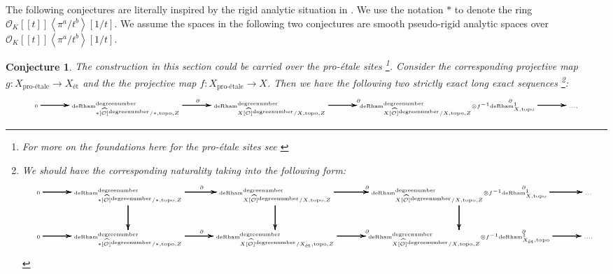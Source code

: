 \documentclass[11pt]{book}
\newtheorem{conjecture}[theorem]{Conjecture}
\theoremstyle{definition}
\numberwithin{equation}{section}
\begin{document}
\indent The following conjectures are literally inspired by the rigid analytic situation in \cite[Theorem 1.2]{12GL}. We use the notation $*$ to denote the ring $\mathcal{O}_K[[t]]\left<\pi^a/t^b\right>[1/t]$. We assume the spaces in the following two conjectures are smooth pseudo-rigid analytic spaces over $\mathcal{O}_K[[t]]\left<\pi^a/t^b\right>[1/t]$.


\newpage

\begin{landscape}
\begin{conjecture}
The construction in this section could be carried over the pro-\'etale sites \footnote{For more on the foundations here for the pro-\'etale sites see \cite[Theorem 2.9.9, Remark 2.9.10]{12Ked1}}. Consider the corresponding projective map $g:X_{\text{pro-\'etale}}\rightarrow X_{\text{\'et}}$ and the the projective map $f:X_{\text{pro-\'etale}}\rightarrow X$. Then we have the following two strictly exact long exact sequences 
\footnote{We should have the corresponding naturality taking into the following form:
\[\tiny
\xymatrix@C+0.4pc@R+0pc{
0\ar[r]\ar[r]\ar[r] \ar[r] &\mathrm{deRham}^\text{degreenumber}_{*[\widehat{\mathcal{O}}]^\text{degreenumber}/*,\mathrm{topo},Z}\ar[d]\ar[d]\ar[d] \ar[d] \ar[r]^\partial\ar[r]\ar[r] \ar[r] &\mathrm{deRham}^\text{degreenumber}_{X[\widehat{\mathcal{O}}]^\text{degreenumber}/X,\mathrm{topo},Z} \ar[d]\ar[d]\ar[d] \ar[d]\ar[r]^\partial\ar[r]\ar[r] \ar[r] &\mathrm{deRham}^\text{degreenumber}_{X[\widehat{\mathcal{O}}]^\text{degreenumber}/X,\mathrm{topo},Z}{\otimes}f^{-1} \mathrm{deRham}^1_{X,\mathrm{topo}} \ar[d]\ar[d]\ar[d] \ar[d]\ar[r]^\partial\ar[r]\ar[r] \ar[r]&...\\
0\ar[r]\ar[r]\ar[r] \ar[r] &\mathrm{deRham}^\text{degreenumber}_{*[\widehat{\mathcal{O}}]^\text{degreenumber}/*,\mathrm{topo},Z} \ar[r]^\partial\ar[r]\ar[r] \ar[r] &\mathrm{deRham}^\text{degreenumber}_{X[\widehat{\mathcal{O}}]^\text{degreenumber}/X_{\text{\'et}},\mathrm{topo},Z} \ar[r]^\partial\ar[r]\ar[r] \ar[r] &\mathrm{deRham}^\text{degreenumber}_{X[\widehat{\mathcal{O}}]^\text{degreenumber}/X,\mathrm{topo},Z}{\otimes}f^{-1} \mathrm{deRham}^1_{X_{\text{\'et}},\mathrm{topo}} \ar[r]^\partial\ar[r]\ar[r] \ar[r] &....
}
\]
}:
\[\tiny
\xymatrix@C+0.4pc@R+0pc{
0\ar[r]\ar[r]\ar[r] \ar[r] &\mathrm{deRham}^\text{degreenumber}_{*[\widehat{\mathcal{O}}]^\text{degreenumber}/*,\mathrm{topo},Z} \ar[r]^\partial\ar[r]\ar[r] \ar[r] &\mathrm{deRham}^\text{degreenumber}_{X[\widehat{\mathcal{O}}]^\text{degreenumber}/X,\mathrm{topo},Z} \ar[r]^\partial\ar[r]\ar[r] \ar[r] &\mathrm{deRham}^\text{degreenumber}_{X[\widehat{\mathcal{O}}]^\text{degreenumber}/X,\mathrm{topo},Z}{\otimes}f^{-1} \mathrm{deRham}^1_{X,\mathrm{topo}} \ar[r]^\partial\ar[r]\ar[r] \ar[r]&...,
}\]
\end{conjecture}
\end{landscape}
\end{document}
